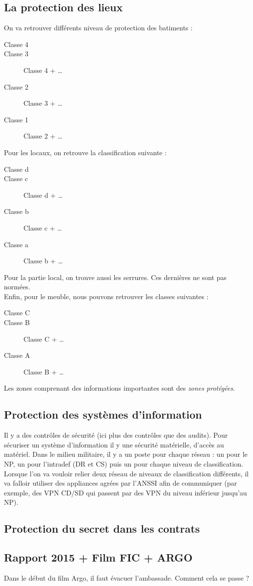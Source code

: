 \subsection{La protection des lieux}
On va retrouver différents niveau de protection des batiments : 
\begin{description}
 \item[Classe 4] 
 \item[Classe 3] Classe 4 + \ldots
 \item[Classe 2] Classe 3 + \ldots
 \item[Classe 1] Classe 2 + \ldots
\end{description}
Pour les locaux, on retrouve la classification suivante :
\begin{description}
 \item[Classe d] 
 \item[Classe c] Classe d + \ldots
 \item[Classe b] Classe c + \ldots
 \item[Classe a] Classe b + \ldots
\end{description}
Pour la partie local, on trouve aussi les serrures. Ces dernières ne sont pas normées.\\
Enfin, pour le meuble, nous pouvons retrouver les classes suivantes :
\begin{description}
 \item[Classe C] 
 \item[Classe B] Classe C + \ldots
 \item[Classe A] Classe B + \ldots
\end{description}
Les zones comprenant des informations importantes sont des \textit{zones protégées}.
\subsection{Protection des systèmes d'information}
Il y a des contrôles de sécurité (ici plus des contrôles que des audits). Pour sécuriser un système d'information il y une sécurité matérielle, d'accès au matériel. Dans le milieu militaire, il y a un poste pour chaque réseau : un pour le NP, un pour l'intradef (DR et CS) puis un pour chaque niveau de classification.\\
Lorsque l'on va vouloir relier deux réseau de niveaux de classification différents, il va falloir utiliser des appliances agrées par l'ANSSI afin de communiquer (par exemple, des VPN CD/SD qui passent par des VPN du niveau inférieur jusqu'au NP).
\subsection{Protection du secret dans les contrats}
\subsection{Rapport 2015 + Film FIC + ARGO}
Dans le début du film Argo, il faut évacuer l’ambassade. Comment cela se passe ?